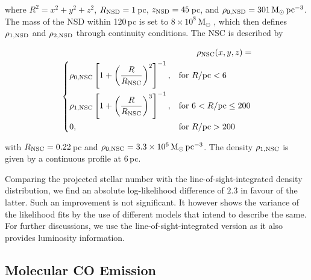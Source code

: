 \documentclass[doublespace,nopageskip]{VTthesis} %
\newcommand{\mrm}[1]{\mathrm{#1}}
\begin{document}
\begin{appendices}
	\noindent where $R^2 = x^2 + y^2 + z^2$, $R_{\rm NSD} = 1$\,pc, $z_{\rm NSD} = 45$\,pc, and $\rho_{0,\rm NSD} = 301\,\mrm{M_{\odot}\,pc^{-3}}$.
	The mass of the NSD within 120\,pc is set to $8 \times 10^{8}\,\mrm{M_{\odot}}$ \citep{Launhardt2002_NB}, which then defines $\rho_{1,\rm NSD}$ and $\rho_{2,\rm NSD}$ through continuity conditions. The NSC is described by
	
	\begin{eqnarray}
		\rho_{\rm NSC}(x,y,z) = & \\\nonumber \left \{
		\begin{aligned}
			&\rho_{0,\rm NSC} \left[1 + \left(\frac{R}{R_{\rm NSC}}\right)^2\right]^{-1}, && \text{for}\ R/\mrm{pc} < 6 \\
			&\rho_{1,\rm NSC} \left[1 + \left(\frac{R}{R_{\rm NSC}}\right)^3\right]^{-1}, && \text{for}\ 6 < R/\mrm{pc} \leq 200 \\
			&0, && \text{for}\ R/\mrm{pc} > 200 
		\end{aligned} \right. &
		\label{eq:NSC_formula}
	\end{eqnarray} 
	
	\noindent with $R_{\rm NSC} = 0.22$\,pc and $\rho_{0,\rm NSC} = 3.3 \times 10^{6}\,\mrm{M_{\odot}\,pc^{-3}}$.
	The density $\rho_{1,\rm NSC}$ is given by a continuous profile at 6\,pc.
	
	Comparing the projected stellar number with the line-of-sight-integrated density distribution, we find an absolute log-likelihood difference of $2.3$ in favour of the latter.
	Such an improvement is not significant.
	It however shows the variance of the likelihood fits by the use of different models that intend to describe the same.
	For further discussions, we use the line-of-sight-integrated version as it also provides luminosity information.
	
	
	\subsection{Molecular CO Emission}
	

\end{appendices}
\end{document}
